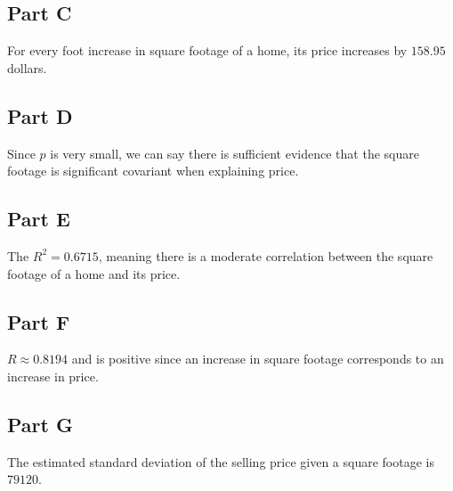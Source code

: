 \documentclass[12pt]{extarticle}
\begin{document}
\subsection*{Part C}
For every foot increase in square footage of a home, its price increases by $158.95$ dollars.

\subsection*{Part D}
Since $p$ is very small, we can say there is sufficient evidence that the square footage is significant covariant when explaining price.

\subsection*{Part E}
The $R^2 = 0.6715$, meaning there is a moderate correlation between the square footage of a home and its price.

\subsection*{Part F}
$R \approx 0.8194$ and is positive since an increase in square footage corresponds to an increase in price.

\subsection*{Part G}
The estimated standard deviation of the selling price given a square footage is $79120$.
\end{document}
